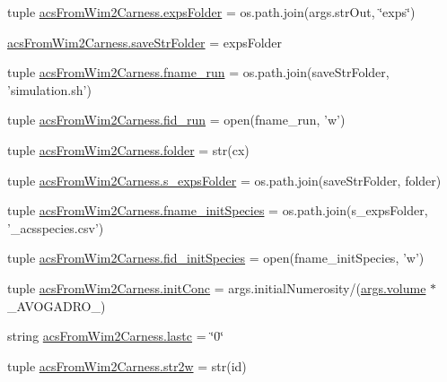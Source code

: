 \begin{DoxyCompactItemize}
tuple \hyperlink{a00126_aa78205fca6ef215871776684bc141b26}{acs\-From\-Wim2\-Carness.\-exps\-Folder} = os.\-path.\-join(args.\-str\-Out, \char`\"{}exps\char`\"{})
\item 
\hyperlink{a00126_adf74f9028f6a6e9a2de2046146a29ffe}{acs\-From\-Wim2\-Carness.\-save\-Str\-Folder} = exps\-Folder
\item 
tuple \hyperlink{a00126_a58053e5bf5bd9f634c82e6fe7a330770}{acs\-From\-Wim2\-Carness.\-fname\-\_\-run} = os.\-path.\-join(save\-Str\-Folder, 'simulation.\-sh')
\item 
tuple \hyperlink{a00126_a107606e6132ad38bc8591a7931a277fc}{acs\-From\-Wim2\-Carness.\-fid\-\_\-run} = open(fname\-\_\-run, 'w')
\item 
tuple \hyperlink{a00126_a42c0d5f9f5131fc14ddb04d765cee15b}{acs\-From\-Wim2\-Carness.\-folder} = str(cx)
\item 
tuple \hyperlink{a00126_ad8daa0d6fb501f0e422c7fb04e93c7cd}{acs\-From\-Wim2\-Carness.\-s\-\_\-exps\-Folder} = os.\-path.\-join(save\-Str\-Folder, folder)
\item 
tuple \hyperlink{a00126_a6053e1a97cef2ed661333b2a7b0cf67e}{acs\-From\-Wim2\-Carness.\-fname\-\_\-init\-Species} = os.\-path.\-join(s\-\_\-exps\-Folder, '\-\_\-acsspecies.\-csv')
\item 
tuple \hyperlink{a00126_aac88079820753d1e8c6628b7016a71d5}{acs\-From\-Wim2\-Carness.\-fid\-\_\-init\-Species} = open(fname\-\_\-init\-Species, 'w')
\item 
tuple \hyperlink{a00126_a4fad8527bf8c9b7981003678aba3edff}{acs\-From\-Wim2\-Carness.\-init\-Conc} = args.\-initial\-Numerosity/(\hyperlink{a00113_a9bc498ccac8db41438f855f5dd3f4c05}{args.\-volume} $\ast$ \-\_\-\-A\-V\-O\-G\-A\-D\-R\-O\-\_\-)
\item 
string \hyperlink{a00126_ae1f2c64eb13a9c020ffe6ec073883573}{acs\-From\-Wim2\-Carness.\-lastc} = \char`\"{}0\char`\"{}
\item 
tuple \hyperlink{a00126_a015e630bcbd779acd7f68bf514793e0d}{acs\-From\-Wim2\-Carness.\-str2w} = str(id)
\end{DoxyCompactItemize}
